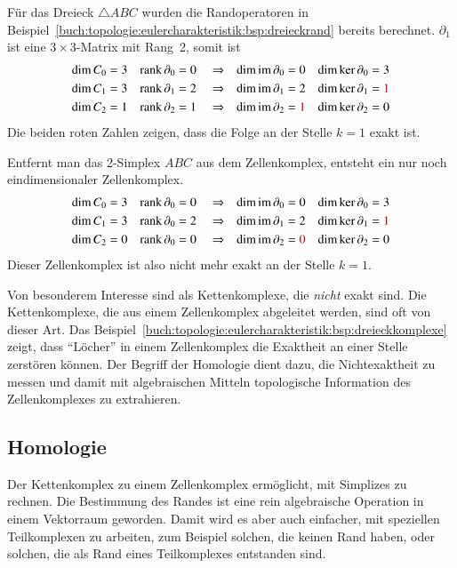 \begin{beispiel}
\label{buch:topologie:eulercharakteristik:bsp:dreieckkomplexe}
Für das Dreieck $\triangle ABC$ wurden die Randoperatoren in
Beispiel~\ref{buch:topologie:eulercharakteristik:bsp:dreieckrand}
bereits berechnet.
$\partial_1$ ist eine $3\times 3$-Matrix mit Rang~2, somit ist
\begin{align*}
\dim C_0 &= 3 &
\operatorname{rank} \partial_0 &= 0&
&\Rightarrow&
\dim \operatorname{im}\partial_0 &= 0 &
\dim \ker\partial_0 &= 3
\\
\dim C_1 &= 3 &
\operatorname{rank} \partial_1 &= 2&
&\Rightarrow&
\dim \operatorname{im}\partial_1 &= 2 &
\dim \ker\partial_1 &= {\color{darkred}1}
\\
\dim C_2 &= 1 &
\operatorname{rank} \partial_2 &= 1&
&\Rightarrow&
\dim \operatorname{im}\partial_2 &= {\color{darkred}1} &
\dim \ker\partial_2 &= 0
\end{align*}
Die beiden roten Zahlen zeigen, dass die Folge an der Stelle $k=1$
exakt ist.

Entfernt man das 2-Simplex $ABC$ aus dem Zellenkomplex, entsteht
ein nur noch eindimensionaler Zellenkomplex.
\begin{align*}
\dim C_0 &= 3 &
\operatorname{rank} \partial_0 &= 0&
&\Rightarrow&
\dim \operatorname{im}\partial_0 &= 0 &
\dim \ker\partial_0 &= 3
\\
\dim C_1 &= 3 &
\operatorname{rank} \partial_0 &= 2&
&\Rightarrow&
\dim \operatorname{im}\partial_1 &= 2 &
\dim \ker\partial_1 &= {\color{darkred}1}
\\
\dim C_2 &= 0 &
\operatorname{rank} \partial_0 &= 0&
&\Rightarrow&
\dim \operatorname{im}\partial_2 &= {\color{darkred}0} &
\dim \ker\partial_2 &= 0
\end{align*}
Dieser Zellenkomplex ist also nicht mehr exakt an der Stelle $k=1$.
\end{beispiel}

Von besonderem Interesse sind als Kettenkomplexe, die \emph{nicht}
exakt sind.
Die Kettenkomplexe, die aus einem Zellenkomplex abgeleitet
werden, sind oft von dieser Art.
Das Beispiel~\ref{buch:topologie:eulercharakteristik:bsp:dreieckkomplexe}
zeigt, dass ``Löcher'' in einem Zellenkomplex die Exaktheit an einer 
Stelle zerstören können.
Der Begriff der Homologie dient dazu, die Nichtexaktheit zu messen und
damit mit algebraischen Mitteln topologische Information des Zellenkomplexes
zu extrahieren.

%
%
\subsection{Homologie
\label{buch:topologie:simplex:subsection:homologie}}
Der Kettenkomplex zu einem Zellenkomplex ermöglicht, mit Simplizes zu rechnen.
Die Bestimmung des Randes ist eine rein algebraische Operation
in einem Vektorraum geworden.
Damit wird es aber auch einfacher, mit speziellen Teilkomplexen
zu arbeiten, zum Beispiel solchen, die keinen Rand haben, oder solchen,
die als Rand eines Teilkomplexes entstanden sind.

